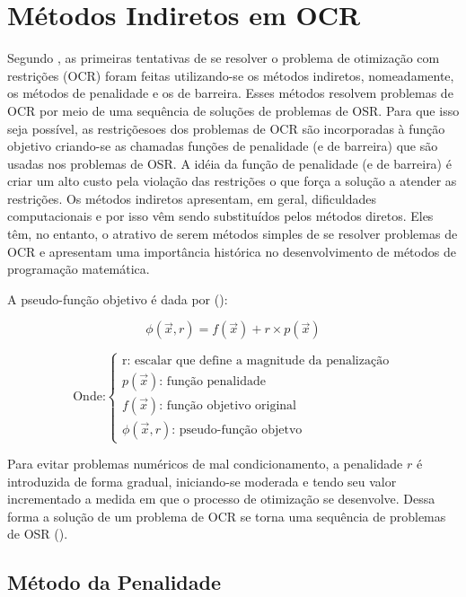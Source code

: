 \documentclass[10pt, a4paper]{article}
\begin{document}
\section{M\'etodos Indiretos em OCR}

Segundo \cite{apostila}, as primeiras tentativas de se resolver o problema de otimiza\c c\~ao com restri\c c\~oes (OCR) foram feitas utilizando-se os m\'etodos indiretos, nomeadamente, os m\'etodos de penalidade e os de barreira. Esses m\'etodos resolvem problemas de OCR por meio de uma sequ\^encia de solu\c c\~oes de problemas de OSR. Para que isso seja poss\'ivel, as restri\c c\~oesoes dos problemas de OCR s\~ao incorporadas \`a fun\c c\~ao objetivo criando-se as chamadas fun\c c\~oes de penalidade (e de barreira) que s\~ao usadas nos problemas de OSR. A id\'eia da fun\c c\~ao de penalidade (e de barreira) \'e criar um alto custo pela viola\c c\~ao das restri\c c\~oes o que for\c ca a solu\c c\~ao a atender as restri\c c\~oes. Os m\'etodos indiretos apresentam, em geral, dificuldades computacionais e por isso v\^em sendo substitu\'idos pelos m\'etodos diretos. Eles t\^em, no entanto, o atrativo de serem m\'etodos simples de se resolver problemas de OCR e apresentam uma import\^ancia hist\'orica no desenvolvimento de m\'etodos de programa\c c\~ao matem\'atica.

A pseudo-fun\c c\~ao objetivo \'e dada por (\cite{ppt}):

\begin{equation}
      \phi (\vec{x}, r) = f(\vec{x}) + r \times p(\vec{x})
\end{equation}

\small
$$
\text{Onde:} \begin{cases}
      \text{r: escalar que define a magnitude da penaliza\c c\~ao}\\
      \text{$p(\vec{x})$: fun\c c\~ao penalidade}\\
      \text{$f(\vec{x})$: fun\c c\~ao objetivo original}\\
      \text{$\phi (\vec{x}, r)$: pseudo-fun\c c\~ao objetvo}
\end{cases}
$$
\normalsize

Para evitar problemas num\'ericos de mal condicionamento, a penalidade $r$ \'e introduzida de forma gradual, iniciando-se moderada e tendo seu valor incrementado a medida em que o processo de otimiza\c c\~ao se desenvolve. Dessa forma a solu\c c\~ao de um problema de OCR se torna uma sequ\^encia de problemas de OSR (\cite{ppt}).

\subsection{M\'etodo da Penalidade}
\end{document}
